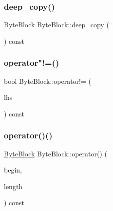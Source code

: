 \mbox{\label{class_byte_block_a67954bc5c1f34b2ab865bacb777c9f37}} 
\subsubsection{\texorpdfstring{deep\+\_\+copy()}{deep\_copy()}}
{\footnotesize\ttfamily \hyperlink{class_byte_block}{Byte\+Block} Byte\+Block\+::deep\+\_\+copy (\begin{DoxyParamCaption}{ }\end{DoxyParamCaption}) const}

\mbox{\label{class_byte_block_a083e6c9d3ec3e39d79953eb48551d0cf}} 
\subsubsection{\texorpdfstring{operator"!=()}{operator!=()}}
{\footnotesize\ttfamily bool Byte\+Block\+::operator!= (\begin{DoxyParamCaption}\item[{const \hyperlink{class_byte_block}{Byte\+Block} \&}]{lhs }\end{DoxyParamCaption}) const}

\mbox{\label{class_byte_block_ad60eb576a039f436736d35e3a6d09131}} 
\subsubsection{\texorpdfstring{operator()()}{operator()()}}
{\footnotesize\ttfamily \hyperlink{class_byte_block}{Byte\+Block} Byte\+Block\+::operator() (\begin{DoxyParamCaption}\item[{size\+\_\+t}]{begin,  }\item[{size\+\_\+t}]{length }\end{DoxyParamCaption}) const}

\mbox{\label{class_byte_block_af34224909c38e21d94d5c869599516ff}} 
